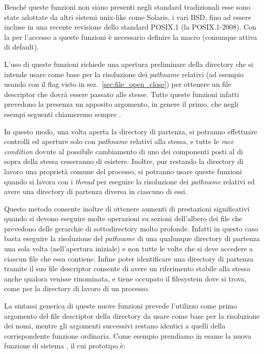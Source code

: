 Benché queste funzioni non siano presenti negli standard tradizionali esse
sono state adottate da altri sistemi unix-like come Solaris, i vari BSD, fino
ad essere incluse in una recente revisione dello standard POSIX.1 (la
POSIX.1-2008). Con la  per l'accesso a queste funzioni è necessario
definire la macro  (comunque attiva di default).

L'uso di queste funzioni richiede una apertura preliminare della directory che
si intende usare come base per la risoluzione dei \textit{pathname} relativi
(ad esempio usando  con il flag  visto in
sez.~\ref{sec:file_open_close}) per ottenere un file descriptor che dovrà
essere passato alle stesse.  Tutte queste funzioni infatti prevedono la
presenza un apposito argomento, in genere il primo, che negli esempi seguenti
chiameremo sempre .

In questo modo, una volta aperta la directory di partenza, si potranno
effettuare controlli ed aperture solo con \textit{pathname} relativi alla
stessa, e tutte le \textit{race condition} dovute al possibile cambiamento di
uno dei componenti posti al di sopra della stessa cesseranno di esistere.
Inoltre, pur restando la directory di lavoro una proprietà comune del
processo, si potranno usare queste funzioni quando si lavora con i
\textit{thread} per eseguire la risoluzione dei \textit{pathname} relativi ed
avere una directory di partenza diversa in ciascuno di essi.

Questo metodo consente inoltre di ottenere aumenti di prestazioni
significativi quando si devono eseguire molte operazioni su sezioni
dell'albero dei file che prevedono delle gerarchie di sottodirectory molto
profonde. Infatti in questo caso basta eseguire la risoluzione del
\textit{pathname} di una qualunque directory di partenza una sola volta
(nell'apertura iniziale) e non tutte le volte che si deve accedere a ciascun
file che essa contiene. Infine poter identificare una directory di partenza
tramite il suo file descriptor consente di avere un riferimento stabile alla
stessa anche qualora venisse rinominata, e tiene occupato il filesystem dove
si trova, come per la directory di lavoro di un processo.

La sintassi generica di queste nuove funzioni prevede l'utilizzo come primo
argomento del file descriptor della directory da usare come base per la
risoluzione dei nomi, mentre gli argomenti successivi restano identici a
quelli della corrispondente funzione ordinaria. Come esempio prendiamo in
esame la nuova funzione di sistema , il cui prototipo è:

